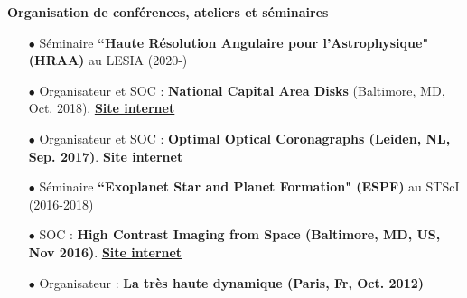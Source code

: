 \documentclass[11pt, a4paper, french]{article}
\begin{document}
\textbf{Organisation de conférences, ateliers et séminaires}\\
\vspace{-0.1cm}
\begin{itemize} \itemsep 5pt
    \item[$\bullet$]\small Séminaire \textbf{``Haute Résolution Angulaire pour l'Astrophysique" (HRAA)} au LESIA (2020-)
    \item[$\bullet$] \small Organisateur et SOC : \textbf{National Capital Area Disks} (Baltimore, MD, Oct. 2018). \href{https://sites.google.com/view/ncad7-at-jhu/ncad7}{\underline{\textbf{Site internet}}}
    \item[$\bullet$] \small Organisateur et SOC : \textbf{Optimal Optical Coronagraphs (Leiden, NL, Sep. 2017)}. \href{https://www.lorentzcenter.nl/lc/web/2017/924/info.php3?wsid=924&venue=Snellius}{\underline{\textbf{Site internet}}}
    \item[$\bullet$]\small Séminaire \textbf{``Exoplanet Star and Planet Formation" (ESPF)} au STScI (2016-2018)
    \item[$\bullet$] \small SOC : \textbf{High Contrast Imaging from Space (Baltimore, MD, US, Nov 2016)}.  \href{http://www.cvent.com/events/high-contrast-imaging-in-space-workshop/event-summary-eb3bb6bd54a342c5a15678daa49be683.aspx}{\underline{\textbf{Site internet}}}
    \item[$\bullet$] \small Organisateur : \textbf{La très haute dynamique (Paris, Fr, Oct. 2012)}
\end{itemize}
\vspace{0.4cm}
\end{document}
